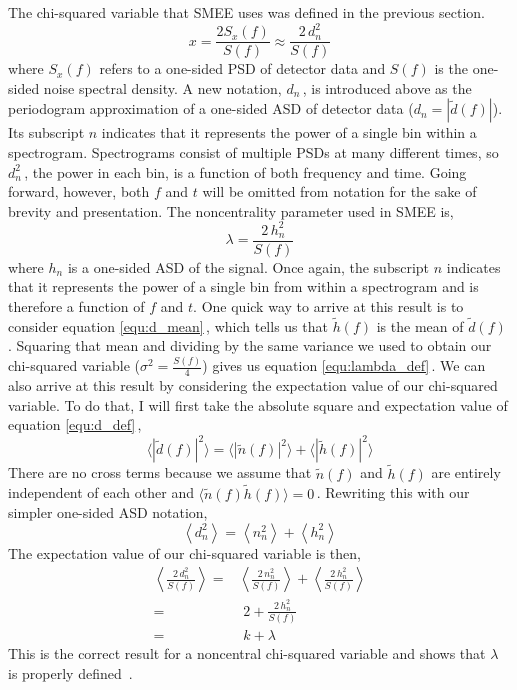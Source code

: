 The chi-squared variable that SMEE uses was defined in the previous section.
\begin{equation}
\label{equ:x_def}
    x = \frac{2S_{x}(f)}{S(f)} \approx \frac{2\,d_{n}^{2}}{S(f)}
\end{equation}
where $S_{x}(f)$ refers to a one-sided PSD of detector data and $S(f)$ is the one-sided noise spectral density. A new notation, $d_{n}\,$, is introduced above as the periodogram approximation of a one-sided ASD of detector data ($d_{n} = |\tilde{d}(f)|$). Its subscript $n$ indicates that it represents the power of a single bin within a spectrogram. Spectrograms consist of multiple PSDs at many different times, so $d_{n}^{2}\,$, the power in each bin, is a function of both frequency and time. Going forward, however, both $f$ and $t$ will be omitted from notation for the sake of brevity and presentation. The noncentrality parameter used in SMEE is,
\begin{equation}
\label{equ:lambda_def}
    \lambda = \frac{2\,h_{n}^{2}}{S(f)}
\end{equation}
where $h_{n}$ is a one-sided ASD of the signal. Once again, the subscript $n$ indicates that it represents the power of a single bin from within a spectrogram and is therefore a function of $f$ and $t$. One quick way to arrive at this result is to consider equation \ref{equ:d_mean}\,, which tells us that $\tilde{h}(f)$ is the mean of $\tilde{d}(f)\,$. Squaring that mean and dividing by the same variance we used to obtain our chi-squared variable ($\sigma^{2} = \frac{S(f)}{4}$) gives us equation \ref{equ:lambda_def}\,. We can also arrive at this result by considering the expectation value of our chi-squared variable. To do that, I will first take the absolute square and expectation value of equation \ref{equ:d_def}\,,
\begin{equation}
\label{equ:d2_def}
    \langle |\tilde{d}(f)|^{2} \rangle = \langle |\tilde{n}(f)|^{2} \rangle + \langle |\tilde{h}(f)|^{2} \rangle
\end{equation}
There are no cross terms because we assume that $\tilde{n}(f)$ and $\tilde{h}(f)$ are entirely independent of each other and $\langle \tilde{n}(f)\tilde{h}(f) \rangle = 0$\,. Rewriting this with our simpler one-sided ASD notation,
\begin{equation}
    \left\langle d_{n}^{2} \right\rangle = \left\langle n_{n}^{2} \right\rangle + \left\langle h_{n}^{2} \right\rangle
\end{equation}
The expectation value of our chi-squared variable is then,
\begin{equation}
    \begin{split}
    \left\langle \frac{2\,d_{n}^{2}}{S(f)} \right\rangle =& \left\langle \frac{2\,n_{n}^{2}}{S(f)} \right\rangle + \left\langle \frac{2\,h_{n}^{2}}{S(f)} \right\rangle \\
    =& \,\,2 + \frac{2\,h_{n}^{2}}{S(f)} \\
    =& \,\,k + \lambda
    \end{split}
\end{equation}
This is the correct result for a noncentral chi-squared variable and shows that $\lambda$ is properly defined~\cite{stats_shao, freedman2007statistics}.

